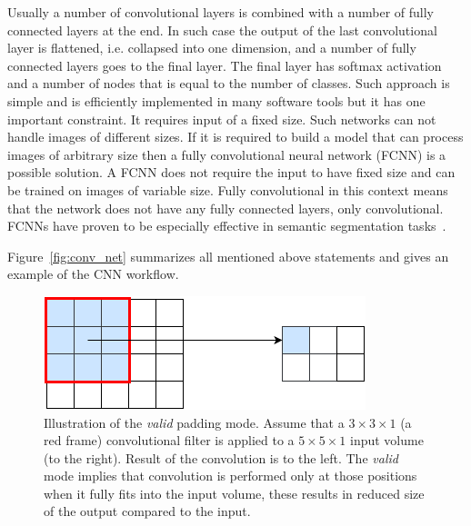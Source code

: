 \documentclass[a4paper, 11pt, table]{article}
\begin{document}
Usually a number of convolutional layers is combined with a number of fully connected layers at the end. In such case the output of the last convolutional layer is flattened, i.e. collapsed into one dimension, and a number of fully connected layers goes  to the final layer. The final layer has softmax activation and a number of nodes that is equal to the number of classes. Such  approach is simple and is efficiently implemented in many software tools but it has one important constraint. It requires input of a fixed size. Such networks can not handle images of different sizes. If it is required to build a model that can process images of arbitrary size then a fully convolutional neural network (FCNN) is a possible solution. A FCNN does not require the input to have fixed size and can be trained on images of variable size. Fully convolutional in this context means that the network does not have any fully connected layers, only convolutional. FCNNs have proven to be especially effective in semantic segmentation tasks~\cite{DBLP:journals/corr/ShelhamerLD16}.

Figure~\ref{fig:conv_net} summarizes all mentioned above statements and gives an example of the CNN workflow.  

\begin{figure}[H]
\centering
\includegraphics[scale=0.7]{padding_valid.png} 
\caption{Illustration of the \textit{valid} padding mode. Assume that a $3 \times 3 \times 1$ (a red frame) convolutional filter is applied to a $5 \times 5 \times 1$ input volume (to the right). Result of the convolution is to the left. The \textit{valid} mode implies that convolution is performed only at those positions when it fully fits into the input volume, these results in reduced size of the output compared to the input.}
\label{fig:padding_valid}
\end{figure}
\end{document}
